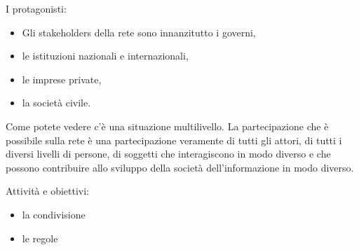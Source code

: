 I protagonisti:

\begin{itemize}
    \item Gli stakeholders della rete sono innanzitutto i governi,
    \item le istituzioni nazionali e internazionali,
    \item le imprese private,
    \item la società civile.
\end{itemize}

Come potete vedere c'è una situazione multilivello. La partecipazione che è possibile sulla rete è una partecipazione veramente di tutti gli attori, di tutti i diversi livelli di persone, di soggetti che interagiscono in modo diverso e che possono contribuire allo sviluppo della società dell'informazione in modo diverso.

Attività e obiettivi:

\begin{itemize}
    \item la condivisione
    \item le regole
\end{itemize}

